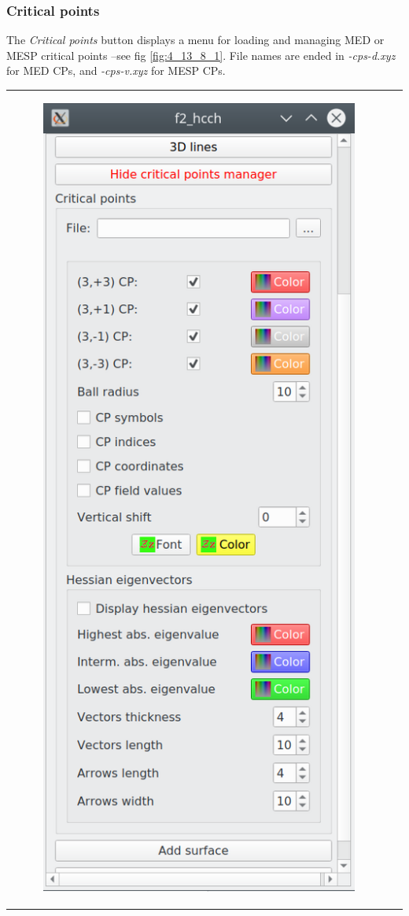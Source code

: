 \documentclass[10pt]{article}
\begin{document}
\subsubsection{Critical points \label{sec:4.13.8}}

The {\it Critical points} button displays a menu for loading and managing MED 
or MESP critical points --see fig \ref{fig:4_13_8_1}.
File names are ended in {\it -cps-d.xyz} for MED CPs, and {\it -cps-v.xyz} for MESP CPs.

\vspace*{5mm}
\hspace*{-5mm}
\begin{tabular}{lr}
\begin{minipage}{.4\linewidth}
    \begin{figure}[H]
        \begin{center}
            \includegraphics[width=0.625\linewidth]{damqt320_CPs_menu.png}

\end{center}
\end{figure}
\end{minipage}
\end{tabular}
\end{document}
